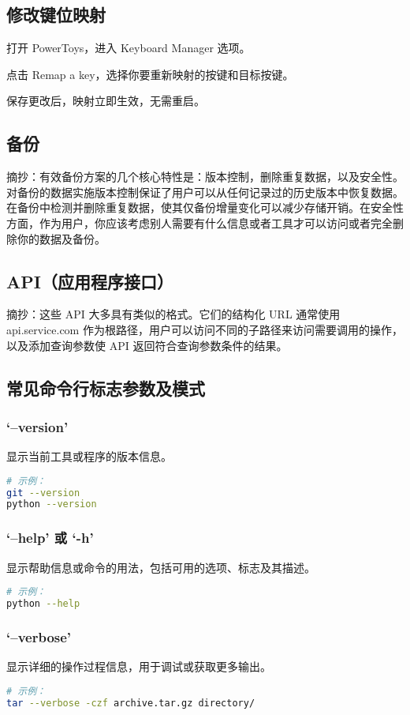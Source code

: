 \documentclass[a4paper, 12pt]{article}
\begin{document}
\subsection{修改键位映射}
打开 PowerToys，进入 Keyboard Manager 选项。

点击 Remap a key，选择你要重新映射的按键和目标按键。

保存更改后，映射立即生效，无需重启。

\subsection{备份}
摘抄：有效备份方案的几个核心特性是：版本控制，删除重复数据，以及安全性。对备份的数据实施版本控制保证了用户可以从任何记录过的历史版本中恢复数据。在备份中检测并删除重复数据，使其仅备份增量变化可以减少存储开销。在安全性方面，作为用户，你应该考虑别人需要有什么信息或者工具才可以访问或者完全删除你的数据及备份。
\subsection{API（应用程序接口）}
摘抄：这些 API 大多具有类似的格式。它们的结构化 URL 通常使用 api.service.com 作为根路径，用户可以访问不同的子路径来访问需要调用的操作，以及添加查询参数使 API 返回符合查询参数条件的结果。

\subsection{常见命令行标志参数及模式}

\subsubsection{‘--version’}
显示当前工具或程序的版本信息。
\begin{lstlisting}[language=bash]
# 示例：
git --version
python --version
\end{lstlisting}

\subsubsection{‘--help’ 或 ‘-h’}
显示帮助信息或命令的用法，包括可用的选项、标志及其描述。
\begin{lstlisting}[language=bash]
# 示例：
python --help
\end{lstlisting}

\subsubsection{‘--verbose’}
显示详细的操作过程信息，用于调试或获取更多输出。
\begin{lstlisting}[language=bash]
# 示例：
tar --verbose -czf archive.tar.gz directory/
\end{lstlisting}
\end{document}

